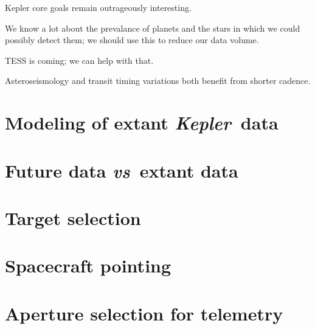 \documentclass[12pt]{article}
\newcommand{\foreign}[1]{\textit{#1}}
\newcommand{\vs}{\foreign{vs}}
\newcommand{\observatory}[1]{\textsl{#1}}
\newcommand{\kepler}{\observatory{Kepler}}
\newcommand{\Kepler}{\kepler}
\begin{document}
Kepler core goals remain outrageously interesting.

We know a lot about the prevalance of planets and the stars in which
we could possibly detect them; we should use this to reduce our data
volume.

TESS is coming; we can help with that.

Asteroseismology and transit timing variations both benefit from
shorter cadence.

\section{Modeling of extant \Kepler\ data}\label{sec:extant}

\section{Future data \vs\ extant data}\label{sec:future}

\section{Target selection}\label{sec:target}

\section{Spacecraft pointing}\label{sec:pointing}

\section{Aperture selection for telemetry}\label{sec:telemetry}
\end{document}
